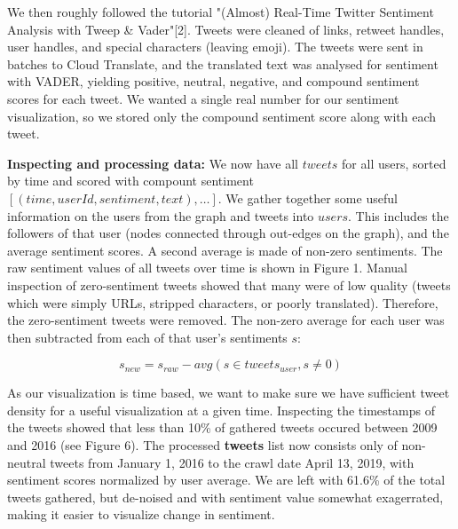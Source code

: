 \documentclass[11pt]{article}
\begin{document}
We then roughly followed the tutorial "(Almost) Real-Time Twitter Sentiment Analysis with Tweep \& Vader"[2]. Tweets were cleaned of links, retweet handles, user handles, and special characters (leaving emoji). The tweets were sent in batches to Cloud Translate, and the translated text was analysed for sentiment with VADER, yielding positive, neutral, negative, and compound sentiment scores for each tweet. We wanted a single real number for our sentiment visualization, so we stored only the compound sentiment score along with each tweet.\newline

\textbf{Inspecting and processing data:} We now have all $tweets$ for all users, sorted by time and scored with compount sentiment $[(time, userId, sentiment, text), \dots]$. We gather together some useful information on the users from the graph and tweets into $users$. This includes the followers of that user (nodes connected through out-edges on the graph), and the average sentiment scores. A second average is made of non-zero sentiments.\newline
The raw sentiment values of all tweets over time is shown in Figure 1. Manual inspection of zero-sentiment tweets showed that many were of low quality (tweets which were simply URLs, stripped characters, or poorly translated). Therefore, the zero-sentiment tweets were removed. The non-zero average for each user was then subtracted from each of that user's sentiments $s$:

\[
    s_{new} = s_{raw} - avg(s\in tweets_{user}, s \neq 0)
\]

As our visualization is time based, we want to make sure we have sufficient tweet density for a useful visualization at a given time. Inspecting the timestamps of the tweets showed that less than 10\% of gathered tweets occured between 2009 and 2016 (see Figure 6). The processed \textbf{tweets} list now consists only of non-neutral tweets from January 1, 2016 to the crawl date April 13, 2019, with sentiment scores normalized by user average. We are left with 61.6\% of the total tweets gathered, but de-noised and with sentiment value somewhat exagerrated, making it easier to visualize change in sentiment.
\end{document}
